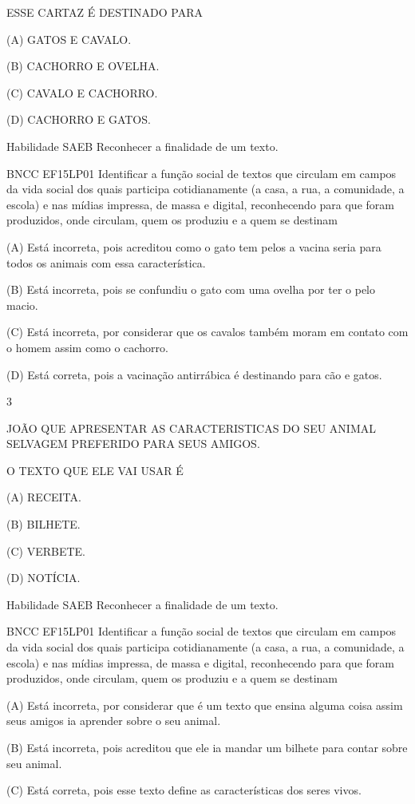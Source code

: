 {{{{ESSE CARTAZ É DESTINADO PARA

(A) GATOS E CAVALO.

(B) CACHORRO E OVELHA.

(C) CAVALO E CACHORRO.

(D) CACHORRO E GATOS.

\protect\hypertarget{_Hlk128891305}{}{}Habilidade SAEB Reconhecer a
finalidade de um texto.

BNCC EF15LP01 Identificar a função social de textos que circulam em
campos da vida social dos quais participa cotidianamente (a casa, a rua,
a comunidade, a escola) e nas mídias impressa, de massa e digital,
reconhecendo para que foram produzidos, onde circulam, quem os produziu
e a quem se destinam

(A) Está incorreta, pois acreditou como o gato tem pelos a vacina seria
para todos os animais com essa característica.

(B) Está incorreta, pois se confundiu o gato com uma ovelha por ter o
pelo macio.

(C) Está incorreta, por considerar que os cavalos também moram em
contato com o homem assim como o cachorro.

(D) Está correta, pois a vacinação antirrábica é destinando para cão e
gatos.

\num{3}

JOÃO QUE APRESENTAR AS CARACTERISTICAS DO SEU ANIMAL SELVAGEM PREFERIDO
PARA SEUS AMIGOS.

O TEXTO QUE ELE VAI USAR É

(A) RECEITA.

(B) BILHETE.

(C) VERBETE.

(D) NOTÍCIA.

Habilidade SAEB Reconhecer a finalidade de um texto.

BNCC EF15LP01 Identificar a função social de textos que circulam em
campos da vida social dos quais participa cotidianamente (a casa, a rua,
a comunidade, a escola) e nas mídias impressa, de massa e digital,
reconhecendo para que foram produzidos, onde circulam, quem os produziu
e a quem se destinam

(A) Está incorreta, por considerar que é um texto que ensina alguma
coisa assim seus amigos ia aprender sobre o seu animal.

(B) Está incorreta, pois acreditou que ele ia mandar um bilhete para
contar sobre seu animal.

(C) Está correta, pois esse texto define as características dos seres
vivos.

}}}}
